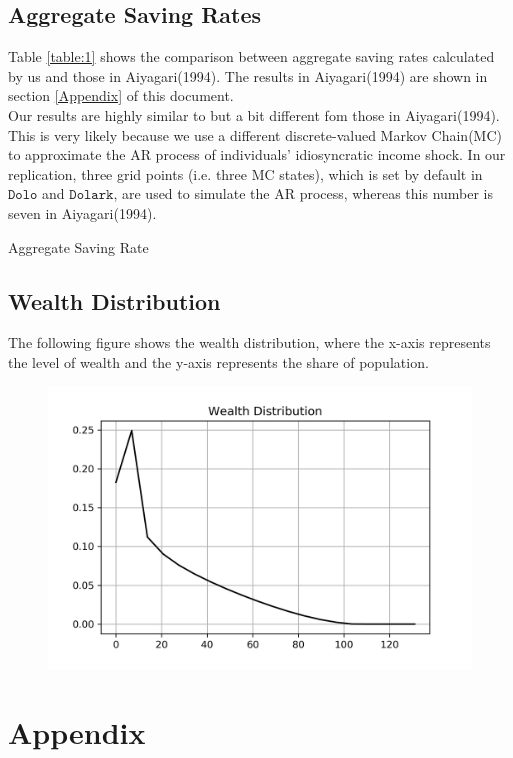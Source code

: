 \documentclass[]{article}
\begin{document}
\subsection{Aggregate Saving Rates}
Table \ref{table:1} shows the comparison between aggregate saving rates calculated by us and those in Aiyagari(1994). The results in Aiyagari(1994) are shown in section \ref{Appendix} of this document.\\

Our results are highly similar to but a bit different fom those in Aiyagari(1994). This is very likely because we use a different discrete-valued Markov Chain(MC) to approximate the AR process of individuals' idiosyncratic income shock. In our replication, three grid points (i.e. three MC states), which is set by default in $\texttt{Dolo}$ and $\texttt{Dolark}$, are used to simulate the AR process, whereas this number is seven in Aiyagari(1994).
\begin{table}[H]
	\scalebox{.7}{}
	\caption{Aggregate Saving Rate}
	\label{table:2}
\end{table}


\subsection{Wealth Distribution}
The following figure shows the wealth distribution, where the x-axis represents the level of wealth and the y-axis represents the share of population.
\begin{figure}[H]
	\centering
	\includegraphics{Figures/Figure_WealthDistribution}
	\label{figure:1}
\end{figure}

\newpage
\section{Appendix}{\label{Appendix}}
	
\end{document}
